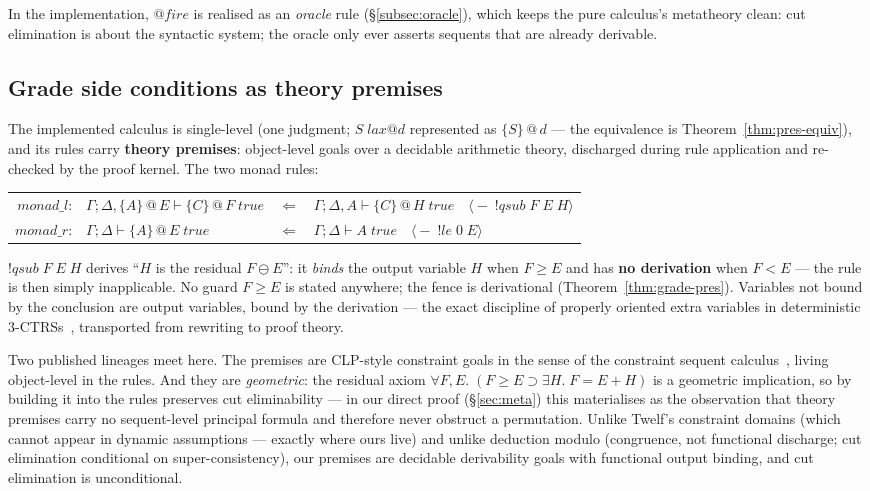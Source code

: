 \documentclass[11pt]{article}
\makeatletter
\newcommand{\lax}[2]{\{#1\}\mathbin{@}#2}       %
\newcommand{\res}{\mathbin{\ominus}}             %
\newcommand{\tr}{\;\mathit{true}}                %
\newcommand{\laxjdg}[1]{\;\mathit{lax}@{#1}}    %
\newcommand{\thprem}[1]{\langle\!\!\!-\;#1\rangle}  %
\theoremstyle{definition}
\theoremstyle{remark}
\makeatother
\begin{document}
In the implementation, $\mathit{@fire}$ is realised as an \emph{oracle} rule
(\S\ref{subsec:oracle}), which keeps the pure calculus's metatheory clean: cut
elimination is about the syntactic system; the oracle only ever asserts sequents
that are already derivable.

\subsection{Grade side conditions as theory premises}

The implemented calculus is single-level (one judgment; $S\laxjdg{d}$
represented as $\lax{S}{d}$ --- the equivalence is
Theorem~\ref{thm:pres-equiv}), and its rules carry \textbf{theory premises}:
object-level goals over a decidable arithmetic theory, discharged during rule
application and re-checked by the proof kernel.  The two monad rules:

\medskip
\begin{center}
\small
\begin{tabular}{@{}r@{\;\;}l@{\quad}l@{\quad}l@{}}
$\mathit{monad\_l}$: &
  $\Gamma; \Delta, \lax{A}{E} \vdash \lax{C}{F}\tr$ &
  $\Leftarrow$ &
  $\Gamma; \Delta, A \vdash \lax{C}{H}\tr\quad
   \thprem{!\mathit{qsub}\;F\;E\;H}$ \\[4pt]
$\mathit{monad\_r}$: &
  $\Gamma; \Delta \vdash \lax{A}{E}\tr$ &
  $\Leftarrow$ &
  $\Gamma; \Delta \vdash A\tr\quad
   \thprem{!\mathit{le}\;0\;E}$
\end{tabular}
\end{center}
\medskip

\noindent$!\mathit{qsub}\;F\;E\;H$ derives ``$H$ is the residual $F \res E$'':
it \emph{binds} the output variable $H$ when $F \geq E$ and has \textbf{no
derivation} when $F < E$ --- the rule is then simply inapplicable.  No guard
$F \geq E$ is stated anywhere; the fence is derivational
(Theorem~\ref{thm:grade-pres}).  Variables not bound by the conclusion are
output variables, bound by the derivation --- the exact discipline of properly
oriented extra variables in deterministic 3-CTRSs~\cite{Ohlebusch2002},
transported from rewriting to proof theory.

Two published lineages meet here.  The premises are CLP-style constraint goals
in the sense of the constraint sequent calculus~\cite{LassezMcAloon1990}, living
object-level in the rules.  And they are \emph{geometric}: the residual axiom
$\forall F, E.\;(F \geq E \supset \exists H.\;F = E + H)$ is a geometric
implication, so by~\cite{NegriVonPlato1998} building it into the rules preserves
cut eliminability --- in our direct proof (\S\ref{sec:meta}) this materialises
as the observation that theory premises carry no sequent-level principal formula
and therefore never obstruct a permutation.  Unlike Twelf's constraint domains
(which cannot appear in dynamic assumptions --- exactly where ours live) and
unlike deduction modulo (congruence, not functional discharge; cut elimination
conditional on super-consistency), our premises are decidable derivability goals
with functional output binding, and cut elimination is unconditional.
\end{document}
